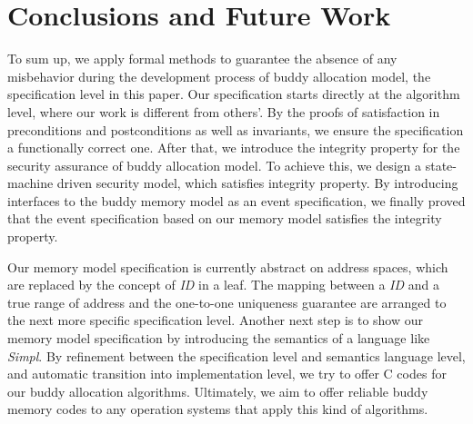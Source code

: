 \documentclass[runningheads]{llncs}
\begin{document}
\section{Conclusions and Future Work}
To sum up, we apply formal methods to guarantee the absence of any misbehavior during the development process of buddy allocation model, the specification level in this paper. Our specification starts directly at the algorithm level, where our work is different from others'. By the proofs of satisfaction in preconditions and postconditions as well as invariants, we ensure the specification a functionally correct one. After that, we introduce the integrity property for the security assurance of buddy allocation model. To achieve this, we design a state-machine driven security model, which satisfies integrity property. By introducing interfaces to the buddy memory model as an event specification, we finally proved that the event specification based on our memory model satisfies the integrity property.

Our memory model specification is currently abstract on address spaces, which are replaced by the concept of \emph{ID} in a leaf. The mapping between a \emph{ID} and a true range of address and the one-to-one uniqueness guarantee are arranged to the next more specific specification level. Another next step is to show our memory model specification by introducing the semantics of a language like \emph{Simpl}. By refinement between the specification level and semantics language level, and automatic transition into implementation level, we try to offer C codes for our buddy allocation algorithms. Ultimately, we aim to offer reliable buddy memory codes to any operation systems that apply this kind of algorithms.
\end{document}
